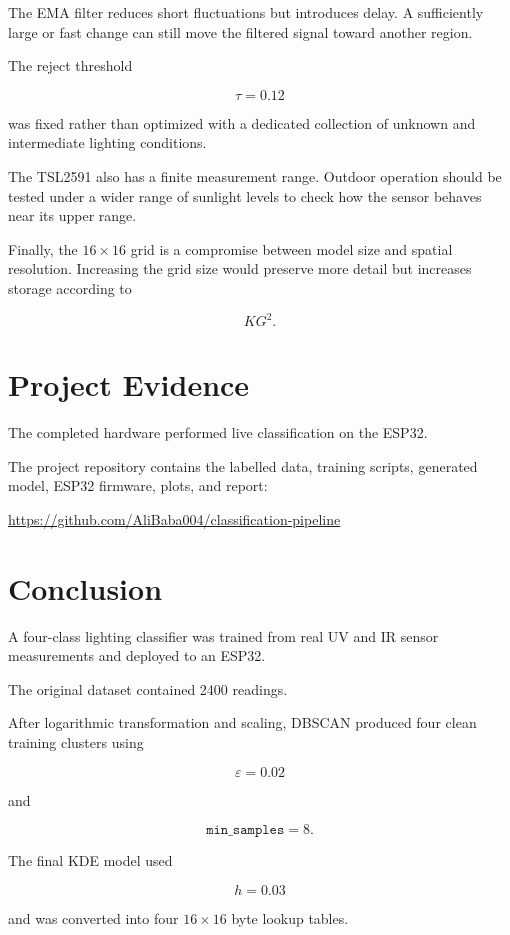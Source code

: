 \documentclass[10pt,a4paper,twocolumn]{article}
\begin{document}
The EMA filter reduces short fluctuations but introduces delay. A sufficiently
large or fast change can still move the filtered signal toward another region.

The reject threshold

\[
\tau=0.12
\]

was fixed rather than optimized with a dedicated collection of unknown and
intermediate lighting conditions.

The TSL2591 also has a finite measurement range. Outdoor operation should be
tested under a wider range of sunlight levels to check how the sensor behaves
near its upper range.

Finally, the $16\times16$ grid is a compromise between model size and spatial
resolution. Increasing the grid size would preserve more detail but increases
storage according to

\[
KG^2.
\]


\section{Project Evidence}

The completed hardware performed live classification on the ESP32.

The project repository contains the labelled data, training scripts, generated
model, ESP32 firmware, plots, and report:

\begin{center}
\url{https://github.com/AliBaba004/classification-pipeline}
\end{center}


\section{Conclusion}

A four-class lighting classifier was trained from real UV and IR sensor
measurements and deployed to an ESP32.

The original dataset contained 2400 readings.

After logarithmic transformation and scaling, DBSCAN produced four clean
training clusters using

\[
\varepsilon=0.02
\]

and

\[
\texttt{min\_samples}=8.
\]

The final KDE model used

\[
h=0.03
\]

and was converted into four $16\times16$ byte lookup tables.
\end{document}
